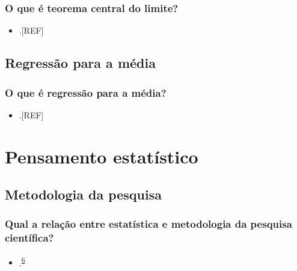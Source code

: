 \documentclass[
  a4paper,
]{book}
\providecommand{\tightlist}{%
  \setlength{\itemsep}{0pt}\setlength{\parskip}{0pt}}
\begin{document}
\hypertarget{o-que-uxe9-teorema-central-do-limite}{%
\subsection{O que é teorema central do limite?}\label{o-que-uxe9-teorema-central-do-limite}}

\begin{itemize}
\tightlist
\item
  .{[}REF{]}
\end{itemize}

\hypertarget{regressao-media}{%
\section{Regressão para a média}\label{regressao-media}}

\hypertarget{o-que-uxe9-regressuxe3o-para-a-muxe9dia}{%
\subsection{O que é regressão para a média?}\label{o-que-uxe9-regressuxe3o-para-a-muxe9dia}}

\begin{itemize}
\tightlist
\item
  .{[}REF{]}
\end{itemize}

\hypertarget{pensamento-estatistico}{%
\chapter{\texorpdfstring{\textbf{Pensamento estatístico}}{Pensamento estatístico}}\label{pensamento-estatistico}}

\hypertarget{metodologia-da-pesquisa}{%
\section{Metodologia da pesquisa}\label{metodologia-da-pesquisa}}

\hypertarget{qual-a-relauxe7uxe3o-entre-estatuxedstica-e-metodologia-da-pesquisa-cientuxedfica}{%
\subsection{Qual a relação entre estatística e metodologia da pesquisa científica?}\label{qual-a-relauxe7uxe3o-entre-estatuxedstica-e-metodologia-da-pesquisa-cientuxedfica}}

\begin{itemize}
\tightlist
\item
  .\textsuperscript{\protect\hyperlink{ref-munafuxf22017}{6}}
\end{itemize}
\end{document}
